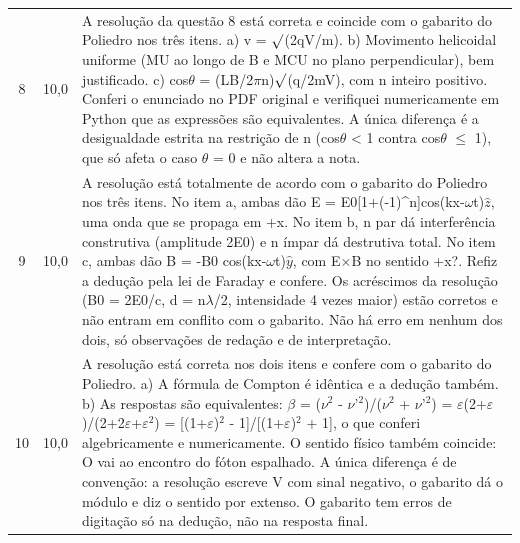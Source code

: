 \documentclass{article}%
\begin{document}
\begin{longtable}{@{}c c p{}@{}}
8 & 10,0 & A resolução da questão 8 está correta e coincide com o gabarito do Poliedro nos três itens. a) v = $\surd$(2qV/m). b) Movimento helicoidal uniforme (MU ao longo de B e MCU no plano perpendicular), bem justificado. c) cos$\theta$ = (LB/2$\pi$n)$\surd$(q/2mV), com n inteiro positivo. Conferi o enunciado no PDF original e verifiquei numericamente em Python que as expressões são equivalentes. A única diferença é a desigualdade estrita na restrição de n (cos$\theta$ < 1 contra cos$\theta$ $\leq$ 1), que só afeta o caso $\theta$ = 0 e não altera a nota. \\
9 & 10,0 & A resolução está totalmente de acordo com o gabarito do Poliedro nos três itens. No item a, ambas dão E = E0{[}1+(-1)\^{}n{]}cos(kx-$\omega$t)$\hat z$, uma onda que se propaga em +x. No item b, n par dá interferência construtiva (amplitude 2E0) e n ímpar dá destrutiva total. No item c, ambas dão B = -B0 cos(kx-$\omega$t)$\hat y$, com E$\times$B no sentido +x?. Refiz a dedução pela lei de Faraday e confere. Os acréscimos da resolução (B0 = 2E0/c, d = n$\lambda$/2, intensidade 4 vezes maior) estão corretos e não entram em conflito com o gabarito. Não há erro em nenhum dos dois, só observações de redação e de interpretação. \\
10 & 10,0 & A resolução está correta nos dois itens e confere com o gabarito do Poliedro. a) A fórmula de Compton é idêntica e a dedução também. b) As respostas são equivalentes: $\beta$ = ($\nu$$^2$ - $\nu$'$^2$)/($\nu$$^2$ + $\nu$'$^2$) = $\varepsilon$(2+$\varepsilon$)/(2+2$\varepsilon$+$\varepsilon$$^2$) = {[}(1+$\varepsilon$)$^2$ - 1{]}/{[}(1+$\varepsilon$)$^2$ + 1{]}, o que conferi algebricamente e numericamente. O sentido físico também coincide: O vai ao encontro do fóton espalhado. A única diferença é de convenção: a resolução escreve V com sinal negativo, o gabarito dá o módulo e diz o sentido por extenso. O gabarito tem erros de digitação só na dedução, não na resposta final. \\
\bottomrule\end{longtable}%
\end{document}
